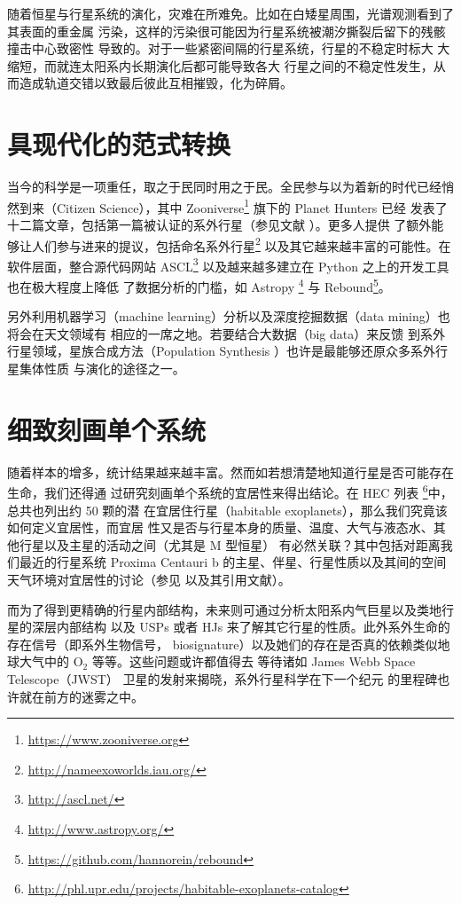 随着恒星与行星系统的演化，灾难在所难免。比如在白矮星周围，光谱观测看到了其表面的重金属
污染\cite{Barstow2014}，这样的污染很可能因为行星系统被潮汐撕裂后留下的残骸撞击中心致密性
导致的\cite{Vanderburg2015,Boyajian2016}。对于一些紧密间隔的行星系统，行星的不稳定时标大
大缩短\cite{Lissauer2011,Lovis2011,MacDonald2016}，而就连太阳系内长期演化后都可能导致各大
行星之间的不稳定性发生，从而造成轨道交错以致最后彼此互相摧毁，化为碎屑\cite{Laskar1988,Laskar1990}。


\section{具现代化的范式转换}

当今的科学是一项重任，取之于民同时用之于民。全民参与以为着新的时代已经悄然到来（Citizen 
Science），其中 Zooniverse\footnote{\url{https://www.zooniverse.org}} 旗下的 Planet Hunters 已经
发表了十二篇文章，包括第一篇被认证的系外行星（参见文献  ）。更多人提供
了额外能够让人们参与进来的提议，包括命名系外行星\footnote{\url{http://nameexoworlds.iau.org/}}
以及其它越来越丰富的可能性\cite{Hessman2010,Marshall2015}。在软件层面，整合源代码网站 
ASCL\footnote{\url{http://ascl.net/}} 以及越来越多建立在 Python 之上的开发工具也在极大程度上降低
了数据分析的门槛，如 Astropy \footnote{\url{http://www.astropy.org/}} 与 
Rebound\footnote{\url{https://github.com/hannorein/rebound}}。

另外利用机器学习（machine learning）分析以及深度挖掘数据（data mining）也将会在天文领域有
相应的一席之地\cite{Ball2010,McCauliff2015,Thompson2015}。若要结合大数据（big data）来反馈
到系外行星领域，星族合成方法（Population Synthesis ）也许是最能够还原众多系外行星集体性质
与演化的途径之一\cite{Benz2014,Mordasini2009}。

\section{细致刻画单个系统}

随着样本的增多，统计结果越来越丰富。然而如若想清楚地知道行星是否可能存在生命，我们还得通
过研究刻画单个系统的宜居性来得出结论。在 HEC 列表
\footnote{\url{http://phl.upr.edu/projects/habitable-exoplanets-catalog}}中，总共也列出约 50 颗的潜
在宜居住行星（habitable exoplanets），那么我们究竟该如何定义宜居性\cite{Kasting1993}，而宜居
性又是否与行星本身的质量、温度、大气与液态水、其他行星以及主星的活动之间（尤其是 M 型恒星）
有必然关联\cite{Kasting2003,Segura2005,Scalo2007}？其中包括对距离我们最近的行星系统 Proxima 
Centauri b 的主星、伴星、行星性质以及其间的空间天气环境对宜居性的讨论（参见 
 以及其引用文献）。

而为了得到更精确的行星内部结构，未来则可通过分析太阳系内气巨星以及类地行星的深层内部结构
以及 USPs 或者 HJs 来了解其它行星的性质。此外系外生命的存在信号（即系外生物信号，
biosignature）以及她们的存在是否真的依赖类似地球大气中的 O$_2$ 等等。这些问题或许都值得去
等待诸如 James Webb Space Telescope（JWST） 卫星的发射来揭晓，系外行星科学在下一个纪元
的里程碑也许就在前方的迷雾之中。









